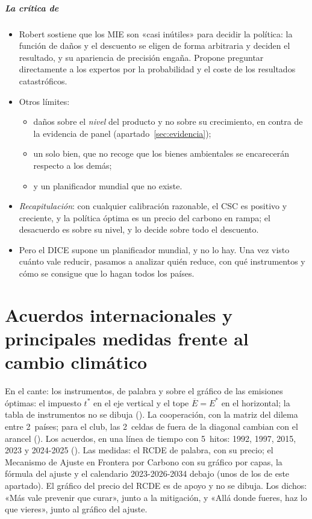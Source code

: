 \documentclass[11pt]{article}
\begin{document}
\subparagraph{La crítica de }

\begin{itemize}
\item Robert \textcite{Pindyck2013Climate} sostiene que los MIE son «casi inútiles» para decidir la política: la función de daños y el descuento se eligen de forma arbitraria y deciden el resultado, y su apariencia de precisión engaña. Propone preguntar directamente a los expertos por la probabilidad y el coste de los resultados catastróficos.
\item Otros límites:
  \begin{itemize}
  \item daños sobre el \emph{nivel} del producto y no sobre su crecimiento, en contra de la evidencia de panel (apartado~\ref{sec:evidencia});
  \item un solo bien, que no recoge que los bienes ambientales se encarecerán respecto a los demás;
  \item y un planificador mundial que no existe.
  \end{itemize}
\end{itemize}

\begin{itemize}
\item \emph{Recapitulación}: con cualquier calibración razonable, el CSC es positivo y creciente, y la política óptima es un precio del carbono en rampa; el desacuerdo es sobre su nivel, y lo decide sobre todo el descuento.
\item Pero el DICE supone un planificador mundial, y no lo hay. Una vez visto cuánto vale reducir, pasamos a analizar quién reduce, con qué instrumentos y cómo se consigue que lo hagan todos los países.
\end{itemize}

\section{Acuerdos internacionales\cortetitulo{} y principales medidas frente al cambio climático}\label{sec:acuerdos-medidas}

\begin{notaopositor}
En el cante: los instrumentos, de palabra y sobre el gráfico de las emisiones óptimas: el impuesto $t^*$ en el eje vertical y el tope $\overline{E}=E^*$ en el horizontal; la tabla de instrumentos no se dibuja (). La cooperación, con la matriz del dilema entre 2~países; para el club, las 2~celdas de fuera de la diagonal cambian con el arancel (). Los acuerdos, en una línea de tiempo con 5~hitos: 1992, 1997, 2015, 2023 y 2024-2025 (). Las medidas: el RCDE de palabra, con su precio; el Mecanismo de Ajuste en Frontera por Carbono con su gráfico por capas, la fórmula del ajuste y el calendario 2023-2026-2034 debajo (unos  de los  de este apartado). El gráfico del precio del RCDE es de apoyo y no se dibuja. Los dichos: «Más vale prevenir que curar», junto a la mitigación, y «Allá donde fueres, haz lo que vieres», junto al gráfico del ajuste.
\end{notaopositor}
\end{document}
